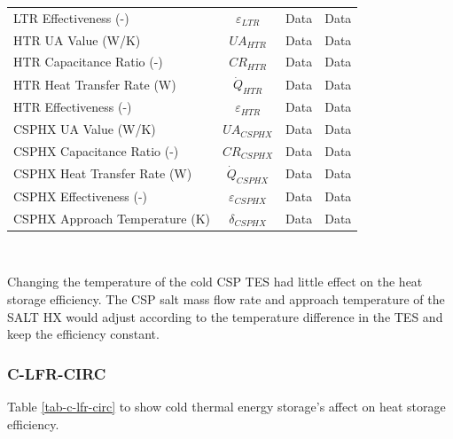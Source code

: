 \begin{paracol}{2}
\begin{specialtable}[H]
\begin{tabular}{lccc}
    LTR Effectiveness (-)	&	$\varepsilon_{LTR}$	&	Data	&	Data	\\
    HTR UA Value (W/K)	&	$UA_{HTR}$	&	Data	&	Data	\\
    HTR Capacitance Ratio (-)	&	$CR_{HTR}$	&	Data	&	Data	\\
    HTR Heat Transfer Rate (W)	&	$\dot{Q}_{HTR}$	&	Data	&	Data	\\
    HTR Effectiveness (-)	&	$\varepsilon_{HTR}$	&	Data	&	Data	\\
    CSPHX UA Value (W/K)	&	$UA_{CSPHX}$	&	Data	&	Data	\\
    CSPHX Capacitance Ratio (-)	&	$CR_{CSPHX}$	&	Data	&	Data	\\
    CSPHX Heat Transfer Rate (W)	&	$\dot{Q}_{CSPHX}$	&	Data	&	Data	\\
    CSPHX Effectiveness (-)	&	$\varepsilon_{CSPHX}$	&	Data	&	Data	\\
    CSPHX Approach Temperature (K)	&	$\delta_{CSPHX}$	&	Data	&	Data	\\
    
    \bottomrule
    \end{tabular}\\
\end{specialtable}

Changing the temperature of the cold CSP TES had little effect on the heat storage efficiency. The CSP salt mass flow rate and approach temperature of the SALT HX would adjust according to the temperature difference in the TES and keep the efficiency constant.


\subsubsection{C-LFR-CIRC}

Table \ref{tab-c-lfr-circ} to show cold thermal energy storage's affect on heat storage efficiency.


\end{paracol}
